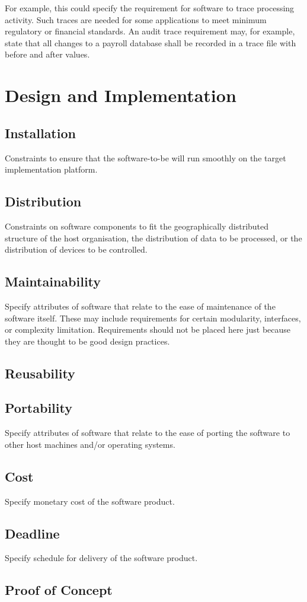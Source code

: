 For example, this could specify the requirement for software to trace processing
activity. Such traces are needed for some applications to meet minimum
regulatory or financial standards. An audit trace requirement may, for example,
state that all changes to a payroll database shall be recorded in a trace file
with before and after values.

\section{Design and Implementation}

\subsection{Installation}

Constraints to ensure that the software-to-be will run smoothly on the target
implementation platform.

\subsection{Distribution}

Constraints on software components to fit the geographically distributed
structure of the host organisation, the distribution of data to be processed, or
the distribution of devices to be controlled.

\subsection{Maintainability}

Specify attributes of software that relate to the ease of maintenance of the
software itself. These may include requirements for certain modularity,
interfaces, or complexity limitation. Requirements should not be placed here
just because they are thought to be good design practices.

\subsection{Reusability}

\subsection{Portability}

Specify attributes of software that relate to the ease of porting the software
to other host machines and/or operating systems.

\subsection{Cost}

Specify monetary cost of the software product.

\subsection{Deadline}

Specify schedule for delivery of the software product.

\subsection{Proof of Concept}
